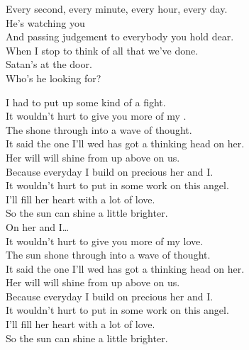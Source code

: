 Every second, every minute, every hour, every day. \\
He's watching you \\
And passing judgement to everybody you hold dear. \\
When I stop to think of all that we've done. \\
Satan's at the door. \\
Who's he looking for? \\





I had to put up some kind of a fight. \\
It wouldn't hurt to give you more of my . \\
The  shone through into a wave of thought. \\
It said the one I'll wed has got a thinking head on her. \\

Her will will shine from up above on us. \\
Because everyday I build on precious her and I. \\
It wouldn't hurt to put in some work on this angel. \\
I'll fill her heart with a lot of love. \\
So the sun can shine a little brighter. \\

On her and I… \\

It wouldn't hurt to give you more of my love. \\
The sun shone through into a wave of thought. \\
It said the one I'll wed has got a thinking head on her. \\
Her will will shine from up above on us. \\

Because everyday I build on precious her and I. \\
It wouldn't hurt to put in some work on this angel. \\
I'll fill her heart with a lot of love. \\
So the sun can shine a little brighter. \\


